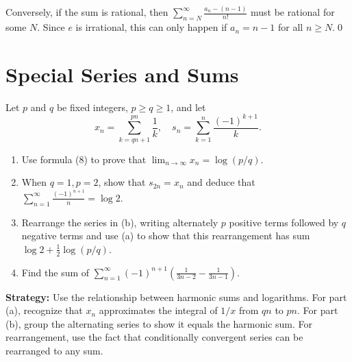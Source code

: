 Conversely, if the sum is rational, then \(\sum_{n=N}^{\infty} \frac{a_n - (n-1)}{n!}\) must be rational for some \(N\). Since \(e\) is irrational, this can only happen if \(a_n = n-1\) for all \(n \geq N\).\qed

\section{Special Series and Sums}



\begin{problembox}
\begin{problemstatement}
Let \(p\) and \(q\) be fixed integers, \(p \geq q \geq 1\), and let
\[x_n = \sum_{k=qn+1}^{pn} \frac{1}{k}, \quad s_n = \sum_{k=1}^{n} \frac{(-1)^{k+1}}{k}.\]
\begin{enumerate}[label=\alph*)]
\item Use formula (8) to prove that \(\lim_{n \to \infty} x_n = \log(p/q)\).
\item When \(q = 1, p = 2\), show that \(s_{2n} = x_n\) and deduce that \(\sum_{n=1}^{\infty} \frac{(-1)^{n+1}}{n} = \log 2\).
\item Rearrange the series in (b), writing alternately \(p\) positive terms followed by \(q\) negative terms and use (a) to show that this rearrangement has sum \(\log 2 + \frac{1}{2} \log(p/q)\).
\item Find the sum of \(\sum_{n=1}^{\infty} (-1)^{n+1} \left( \frac{1}{3n - 2} - \frac{1}{3n - 1} \right)\).
\end{enumerate}
\end{problemstatement}
\end{problembox}

\noindent\textbf{Strategy:} Use the relationship between harmonic sums and logarithms. For part (a), recognize that \(x_n\) approximates the integral of \(1/x\) from \(qn\) to \(pn\). For part (b), group the alternating series to show it equals the harmonic sum. For rearrangement, use the fact that conditionally convergent series can be rearranged to any sum.

